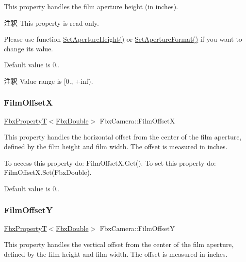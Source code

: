 This property handles the film aperture height (in inches).

\begin{DoxyRemark}{注釈}
This property is read-\/only. 

Please use function \hyperlink{class_fbx_camera_a02bdb12abf27b4ccc0c4554818bdbf8f}{Set\+Aperture\+Height()} or \hyperlink{class_fbx_camera_a5b644b41e4d72c214acfdb5a2dee7576}{Set\+Aperture\+Format()} if you want to change its value.
\end{DoxyRemark}
Default value is 0.. \begin{DoxyRemark}{注釈}
Value range is \mbox{[}0., +inf). 
\end{DoxyRemark}
\mbox{\label{class_fbx_camera_aa0a5e1ab510d4b87db69e8ed6febacc3}} 
\subsubsection{\texorpdfstring{Film\+OffsetX}{FilmOffsetX}}
{\footnotesize\ttfamily \hyperlink{class_fbx_property_t}{Fbx\+PropertyT}$<$\hyperlink{fbxtypes_8h_a171e72a1c46fc15c1a6c9c31948c1c5b}{Fbx\+Double}$>$ Fbx\+Camera\+::\+Film\+OffsetX}

This property handles the horizontal offset from the center of the film aperture, defined by the film height and film width. The offset is measured in inches.

To access this property do\+: Film\+Offset\+X.\+Get(). To set this property do\+: Film\+Offset\+X.\+Set(\+Fbx\+Double).

Default value is 0.. \mbox{\label{class_fbx_camera_a244464e212906b44d5f827a8cdba0444}} 
\subsubsection{\texorpdfstring{Film\+OffsetY}{FilmOffsetY}}
{\footnotesize\ttfamily \hyperlink{class_fbx_property_t}{Fbx\+PropertyT}$<$\hyperlink{fbxtypes_8h_a171e72a1c46fc15c1a6c9c31948c1c5b}{Fbx\+Double}$>$ Fbx\+Camera\+::\+Film\+OffsetY}

This property handles the vertical offset from the center of the film aperture, defined by the film height and film width. The offset is measured in inches.

